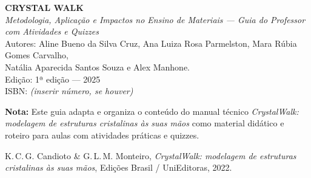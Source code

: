 \documentclass[12pt,openright,oneside]{book}
\begin{document}

\MakeCover

\cleardoublepage
\thispagestyle{empty}
\vspace*{3cm}
\begin{center}
\small
\textbf{CRYSTAL WALK}\\
{\it Metodologia, Aplicação e Impactos no Ensino de Materiais — Guia do Professor com Atividades e Quizzes}\\[1em]
Autores: Aline Bueno da Silva Cruz, Ana Luiza Rosa Parmelston, Mara Rúbia Gomes Carvalho,\\
Natália Aparecida Santos Souza e Alex Manhone.\\[1em]
Edição: 1ª edição — 2025\\[1em]
ISBN: \textit{(inserir número, se houver)}\\[2em]
\end{center}

\noindent\textbf{Nota:} Este guia adapta e organiza o conteúdo do manual técnico \emph{CrystalWalk: modelagem de estruturas cristalinas às suas mãos} como material didático e roteiro para aulas com atividades práticas e quizzes.

\clearpage

\setcounter{page}{1}
\tableofcontents
\cleardoublepage

\setcounter{page}{1}











\appendix




\cleardoublepage
{}
{}
\begin{thebibliography}{9}
K.\,C.\,G. Candioto \& G.\,L.\,M. Monteiro,
\emph{CrystalWalk: modelagem de estruturas cristalinas às suas mãos},
Edições Brasil / UniEditoras, 2022.
\end{thebibliography}
\end{document}
